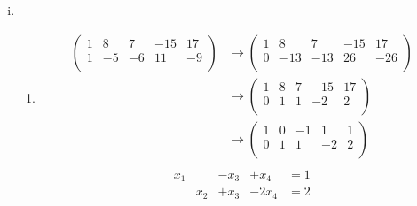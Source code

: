 \documentclass{article}
\begin{document}
\begin{enumerate}[(i)]
\begin{enumerate}
\begin{align*}
\begin{array}{ccc|c}
        1 & -1 & 2 & 3 \\
        0 & 0  & 0 & 0 \\
        0 & 0  & 0 & 0 \\
      \end{array}
      \right)
    \end{align*}
    \begin{align*}
      x_1 - x_2 + 2x_3 &= 3 \\
      x_1              &= x_2 - 2x_3 + 3 \\
    \end{align*}
  \end{enumerate}
\item
  \begin{enumerate}
  \item
    \begin{align*}
      \left(
      \begin{array}{cccc|c}
        1 & 8   & 7  & -15 & 17 \\
        1 & -5  & -6 & 11  & -9 \\
      \end{array}
      \right)
      &\rightarrow
      \left(
        \begin{array}{cccc|c}
          1 & 8    & 7   & -15 & 17  \\
          0 & -13  & -13 & 26  & -26 \\
        \end{array}
      \right) \\
      &\rightarrow
      \left(
        \begin{array}{cccc|c}
          1 & 8 & 7 & -15 & 17 \\
          0 & 1 & 1 & -2  & 2  \\
        \end{array}
      \right) \\
      &\rightarrow
      \left(
        \begin{array}{cccc|c}
          1 & 0 & -1 &  1 & 1 \\
          0 & 1 & 1  & -2 & 2  \\
        \end{array}
      \right) \\      
    \end{align*}
    \[
      \begin{array}{lllll}
        x_1 &     & -x_3 & + x_4  &= 1 \\
            & x_2 & +x_3 & - 2x_4 &= 2 \\
      \end{array}
\]
\end{enumerate}
\end{enumerate}
\end{document}

